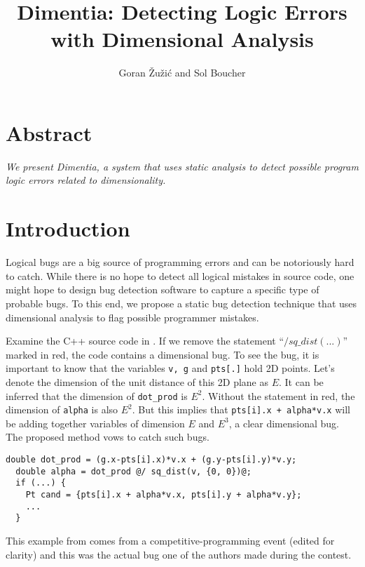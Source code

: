 \documentclass[12pt]{article}
\title{\Large Dimentia: Detecting Logic Errors with Dimensional Analysis}
\author{Goran \v{Z}u\v{z}i\'c and Sol Boucher}
\begin{document}
\maketitle

\section*{Abstract}

\textit{We present \textnormal{Dimentia}, a system that uses static analysis to detect possible program logic errors related to dimensionality.}

\section{Introduction}

Logical bugs are a big source of programming errors and can be notoriously hard to catch. While there is no hope to detect all logical mistakes in source code, one might hope to design bug detection software to capture a specific type of probable bugs. To this end, we propose a static bug detection technique that uses dimensional analysis to flag possible programmer mistakes.

Examine the C++ source code in . If we remove the statement ``\texttt{$/ sq\_dist(...)$}'' marked in red, the code contains a dimensional bug. To see the bug, it is important to know that the variables \texttt{v, g} and \texttt{pts[.]} hold 2D points. Let's denote the dimension of the unit distance of this 2D plane as $E$. It can be inferred that the dimension of \texttt{dot\_prod} is $E^2$. Without the statement in red, the dimension of \texttt{alpha} is also $E^2$. But this implies that \texttt{pts[i].x + alpha*v.x} will be adding together variables of dimension $E$ and $E^3$, a clear dimensional bug. The proposed method vows to catch such bugs.

\begin{lstlisting}[label=code:example1,caption=Example of a dimensional bug]
  double dot_prod = (g.x-pts[i].x)*v.x + (g.y-pts[i].y)*v.y;
  double alpha = dot_prod @/ sq_dist(v, {0, 0})@;
  if (...) {
    Pt cand = {pts[i].x + alpha*v.x, pts[i].y + alpha*v.y};
    ...
  }
\end{lstlisting}

This example from  comes from a competitive-programming event (edited for clarity) and this was the actual bug one of the authors made during the contest. %
\end{document}

